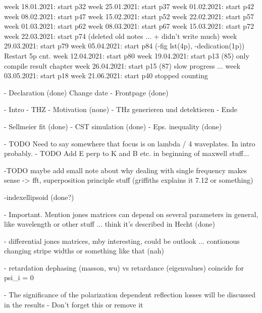 week 18.01.2021: start p32
week 25.01.2021: start p37
week 01.02.2021: start p42
week 08.02.2021: start p47
week 15.02.2021: start p52
week 22.02.2021: start p57
week 01.03.2021: start p62
week 08.03.2021: start p67
week 15.03.2021: start p72
week 22.03.2021: start p74 (deleted old notes ... + didn't write much)
week 29.03.2021: start p79
week 05.04.2021: start p84 (-fig lst(4p), -dedication(1p)) Restart 5p cnt. 
week 12.04.2021: start p80
week 19.04.2021: start p13 (85) only compile result chapter
week 26.04.2021: start p15 (87) slow progress ...
week 03.05.2021: start p18
week 21.06.2021: start p40
stopped counting

- Declaration (done) Change date
- Frontpage (done)

- Intro
    - THZ
    - Motivation (none)
- THz generieren und detektieren
- Ende

- Sellmeier fit (done)
- CST simulation (done)
- Eps. inequality (done)

- TODO Need to say somewhere that focus is on lambda / 4 waveplates. In intro probably.
- TODO Add E perp to K and B etc. in beginning of maxwell stuff...

-TODO maybe add small note about why dealing with single frequency makes sense -> fft, superposition principle stuff (griffiths explains it 7.12 or something)

-indexellipsoid (done?)

- Important. Mention jones matrices can depend on several parameters in general, like wavelength or other stuff ... think it's described in Hecht (done)

- differential jones matrices, mby interesting, could be outlook ... contionous changing stripe widths or something like that (nah)

- retardation dephasing (masson, wu) vs retardance (eigenvalues) coincide for psi_i = 0

- The significance of the polarization dependent reflection losses will be discussed in the results
    - Don't forget this or remove it
    



